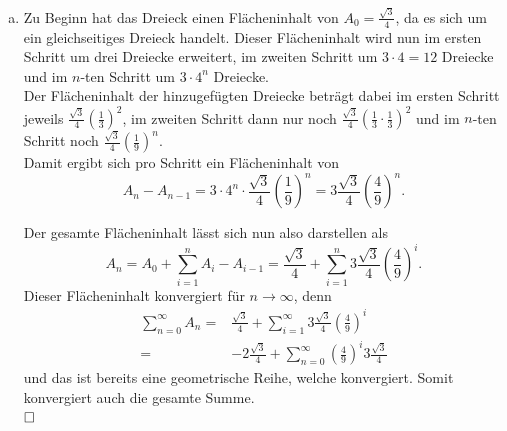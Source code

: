 \documentclass[12pt,a4paper]{article}
\newcommand{\qed}{\null\nobreak\hfill\square}
\begin{document}
\begin{enumerate}[(i)]
\begin{enumerate}[(a)]
        \item Zu Beginn hat das Dreieck einen Flächeninhalt von $A_0 = \frac{\sqrt{3}}{4}$, da es sich um ein gleichseitiges Dreieck handelt.
        Dieser Flächeninhalt wird nun im ersten Schritt um drei Dreiecke erweitert, im zweiten Schritt um $3 \cdot 4 = 12$ Dreiecke und im $n$-ten Schritt um $3 \cdot 4^n$ Dreiecke.\\
        Der Flächeninhalt der hinzugefügten Dreiecke beträgt dabei im ersten Schritt jeweils $\frac{\sqrt{3}}{4} \left(\frac{1}{3}\right)^2$, im zweiten Schritt dann nur noch $\frac{\sqrt{3}}{4} \left(\frac{1}{3} \cdot \frac{1}{3}\right)^2$ und im $n$-ten Schritt noch $\frac{\sqrt{3}}{4} \left(\frac{1}{9}\right)^n$.\\
        Damit ergibt sich pro Schritt ein Flächeninhalt von
        $$A_n - A_{n-1}= 3 \cdot 4^n \cdot \frac{\sqrt{3}}{4} \left(\frac{1}{9}\right)^n = 3 \frac{\sqrt{3}}{4} \left(\frac{4}{9}\right)^n.$$

        Der gesamte Flächeninhalt lässt sich nun also darstellen als
        $$A_n = A_0 + \sum\limits_{i=1}^n A_i - A_{i-1} = \frac{\sqrt{3}}{4} + \sum\limits_{i=1}^n 3 \frac{\sqrt{3}}{4} \left(\frac{4}{9}\right)^i.$$
        Dieser Flächeninhalt konvergiert für $n \to \infty$, denn
        \begin{align*}
        \sum\limits_{n=0}^\infty A_n =& \frac{\sqrt{3}}{4} + \sum\limits_{i=1}^\infty 3 \frac{\sqrt{3}}{4} \left(\frac{4}{9}\right)^i\\
        =& - 2 \frac{\sqrt{3}}{4} + \sum\limits_{n=0}^\infty \left(\frac{4}{9}\right)^i 3 \frac{\sqrt{3}}{4}
        \end{align*}
        und das ist bereits eine geometrische Reihe, welche konvergiert.
        Somit konvergiert auch die gesamte Summe.\\
        $\qed$
    \end{enumerate}
\end{enumerate}


\end{document}
